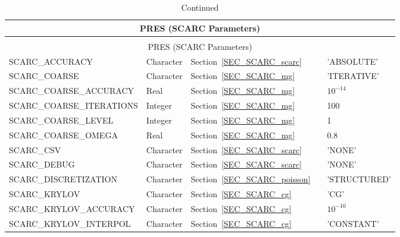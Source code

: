 \begin{longtable}{@{\extracolsep{\fill}}|l|l|l|l|l|}
\caption[SCARC parameters ({\ct PRES} name list group)]{For more information see Section (\ref{SEC_SCARC_cg}).}
\label{TBL_SCARC_parameters} \\
\hline
\multicolumn{5}{|c|}{{\ct PRES} (SCARC Parameters)} \\
\hline \hline
\endfirsthead
\caption[]{Continued} \\
\hline


\multicolumn{5}{|c|}{{\ct PRES} (SCARC Parameters)} \\
\hline \hline
\endhead
{\ct SCARC\_ACCURACY}                        & Character      & Section~\ref{SEC_SCARC_scarc}  & &  {\ct 'ABSOLUTE'}     \\ \hline
{\ct SCARC\_COARSE}                             & Character      & Section~\ref{SEC_SCARC_mg}  & &  {\ct 'ITERATIVE'}    \\ \hline
{\ct SCARC\_COARSE\_ACCURACY}      & Real              & Section~\ref{SEC_SCARC_mg}  & &  $10^{-14}$           \\ \hline
{\ct SCARC\_COARSE\_ITERATIONS}     & Integer          & Section~\ref{SEC_SCARC_mg}  & &  100                 \\ \hline
{\ct SCARC\_COARSE\_LEVEL}               & Integer          & Section~\ref{SEC_SCARC_mg}  & &  1                   \\ \hline
{\ct SCARC\_COARSE\_OMEGA}             & Real              & Section~\ref{SEC_SCARC_mg}  & &  0.8                 \\ \hline
{\ct SCARC\_CSV}                                     & Character      & Section~\ref{SEC_SCARC_scarc}  & &  {\ct 'NONE'}        \\ \hline
{\ct SCARC\_DEBUG}                               & Character      & Section~\ref{SEC_SCARC_scarc}  & &  {\ct 'NONE'}        \\ \hline
{\ct SCARC\_DISCRETIZATION}              & Character      & Section~\ref{SEC_SCARC_poisson}  & &  {\ct 'STRUCTURED'}  \\ \hline
{\ct SCARC\_KRYLOV}                             & Character      & Section~\ref{SEC_SCARC_cg}  & &  {\ct 'CG'}          \\ \hline
{\ct SCARC\_KRYLOV\_ACCURACY}      & Character      & Section~\ref{SEC_SCARC_cg}  & &  $10^{-10}$          \\ \hline
{\ct SCARC\_KRYLOV\_INTERPOL}        & Character      & Section~\ref{SEC_SCARC_cg}  & &  {\ct 'CONSTANT'}    \\ \hline

\end{longtable}
